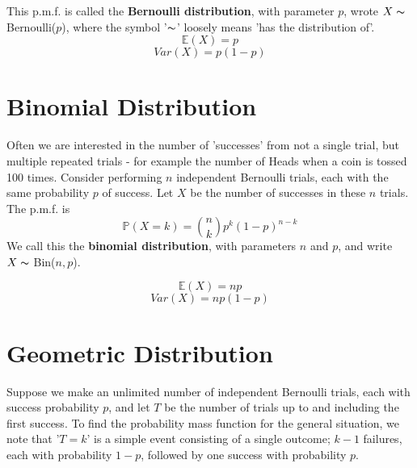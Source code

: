 \documentclass{report}
\begin{document}
This p.m.f. is called the \textbf{Bernoulli distribution}, with parameter $p$, wrote $X\thicksim$ Bernoulli($p$), where the symbol '$\thicksim$' loosely means 'has the distribution of'.\\

\begin{equation}
    \mathbb{E}(X) = p
\end{equation}
\begin{equation}
    Var(X) = p(1-p)
\end{equation}

\section{Binomial Distribution}

Often we are interested in the number of 'successes' from not a single trial, but multiple repeated trials - for example the number of Heads when a coin is tossed 100 times. Consider performing $n$ independent Bernoulli trials, each with the same probability $p$ of success. Let $X$ be the number of successes in these $n$ trials. The p.m.f. is
\begin{equation}
    \mathbb{P}(X = k) = \binom{n}{k}p^k(1-p)^{n-k}
\end{equation}
We call this the \textbf{binomial distribution}, with parameters $n$ and $p$, and write $X \thicksim$ Bin($n,p$).

\begin{equation}
    \mathbb{E}(X) = np
\end{equation}
\begin{equation}
    Var(X) = np(1-p)
\end{equation}

\section{Geometric Distribution}

Suppose we make an unlimited number of independent Bernoulli trials, each with success probability $p$, and let $T$ be the number of trials up to and including the first success. To find the probability mass function for the general situation, we note that '$T = k$' is a simple event consisting of a single outcome; $k-1$ failures, each with probability $1-p$, followed by one success with probability $p$.
\end{document}
